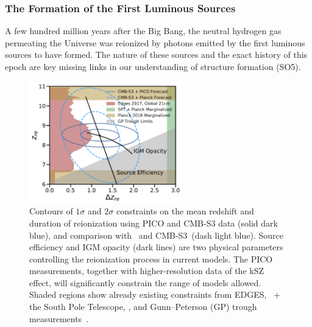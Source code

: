 \documentclass[PICOReport.tex]{subfiles}
\begin{document}
\subsubsection{The Formation of the First Luminous Sources} 
\label{sec:luminoussources}  

A few hundred million years after the Big Bang, the neutral hydrogen gas permeating the Universe was reionized by photons emitted by the first luminous sources to have formed.  The nature of these sources and the exact history of this epoch are key missing links in our understanding of structure formation (SO5).  
\begin{figure}
\hspace{-0.2in}
\parbox{3.1in}{\centerline {
\includegraphics[width=2.6in]{images/Reionization_Contours_zbar_delz_PICO_NEW.pdf} } }
\hspace{0.in}
\parbox{3.5in}{
\caption{\captiontext 
Contours of $1\sigma$ and $2\sigma$ constraints on the mean redshift and duration of reionization using PICO and CMB-S3 data (solid dark blue), and comparison with \planck\ and CMB-S3~(dash light blue). Source efficiency and IGM opacity (dark lines) are two physical parameters controlling the reionization process in current models. The PICO measurements, together with higher-resolution data of the kSZ effect, will significantly constrain the range of models allowed. Shaded regions show already existing constraints from EDGES, \planck\ + the South Pole Telescope,  \planck , and Gunn--Peterson (GP) trough measurements~\citep{Planck2018_VI,EDGES2017,Fan2006,Planck2016_reion}.  
\label{fig:ReionizationPICO} } }
\vspace{-0.15in}
\end{figure}
\end{document}

